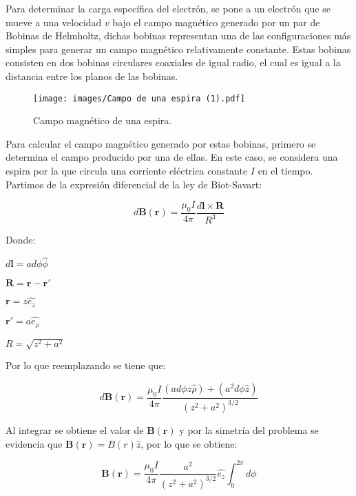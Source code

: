 Para determinar la carga específica del electrón, se pone a un electrón que se mueve a una velocidad $v$ bajo el campo magnético 
generado por un par de Bobinas de Helmholtz, dichas bobinas representan una de las configuraciones más
simples para generar un campo magnético relativamente constante. Estas bobinas consisten en dos bobinas circulares coaxiales de igual
radio, el cual es igual a la distancia entre los planos de las bobinas.



\begin{figure}[H]
    \centering
    \texttt{[image: images/Campo de una espira (1).pdf]}
    \caption{Campo magnético de una espira.}
    \label{fig:una_espira}
\end{figure}

Para calcular el campo magnético generado por estas bobinas, primero se determina el campo producido por una de ellas. En este caso, se considera una espira por la que circula una corriente eléctrica constante $I$ en el tiempo. Partimos de la expresión diferencial de la ley de Biot-Savart:

\begin{equation}\label{eq:Biot-Savart}
    d\mathbf{B}(\mathbf{r}) = \frac{\mu_0 I}{4 \pi} \frac{d\mathbf{l} \times \mathbf{R}}{R^{3}}
\end{equation}

Donde:

$d\mathbf{l}=a d\phi \hat{\phi}$ 

$\mathbf{R}=\mathbf{r}-\mathbf{r'}$ 

$\mathbf{r}=z\hat{e_{z}}$

$\mathbf{r'}=a\hat{e_{\rho}}$

$R=\sqrt{z^{2}+a^{2}}$ 

Por lo que reemplazando se tiene que:

\begin{equation} 
    d\mathbf{B}(\mathbf{r}) = \frac{\mu_{0}I}{4\pi} \frac{(a d\phi z \hat{\rho}) + (a^{2}d\phi \hat{z})}{(z^{2}+a^{2})^{3/2}}
\end{equation} 

Al integrar se obtiene el valor de $\mathbf{B}(\mathbf{r})$ y por la simetría del problema se evidencia que $\mathbf{B}(\mathbf{r}) = B(r)\hat{z}$, por lo que se obtiene:

\begin{equation} 
	\mathbf{B}(\mathbf{r}) = \frac{\mu_{0}I}{4 \pi} \frac{a^{2}}{(z^{2}+a^{2})^{3/2}} \hat{e_{z}} \int _{0}^{2 \pi} d\phi
\end{equation}

